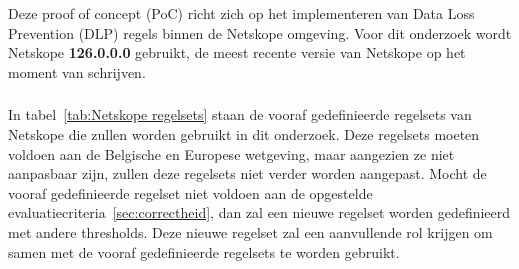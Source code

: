 
\chapter{}%
\label{ch:proofofconcept}

\section{}
\label{sec:DLP rules}

Deze proof of concept (PoC) richt zich op het implementeren van Data Loss Prevention (DLP) regels binnen de Netskope omgeving.
Voor dit onderzoek wordt Netskope \textbf{126.0.0.0} gebruikt, de meest recente versie van Netskope op het moment van schrijven.

\subsection{}
\label{subsec:vooraf-gedefinieerde-regelsets}

In tabel~\ref{tab:Netskope regelsets} staan de vooraf gedefinieerde regelsets van Netskope die zullen worden gebruikt in dit onderzoek. 
Deze regelsets moeten voldoen aan de Belgische en Europese wetgeving, maar aangezien ze niet aanpasbaar zijn, zullen deze regelsets niet verder worden aangepast. 
Mocht de vooraf gedefinieerde regelset niet voldoen aan de opgestelde evaluatiecriteria~\ref{sec:correctheid}, dan zal een nieuwe regelset worden gedefinieerd met andere thresholds. 
Deze nieuwe regelset zal een aanvullende rol krijgen om samen met de vooraf gedefinieerde regelsets te worden gebruikt.

